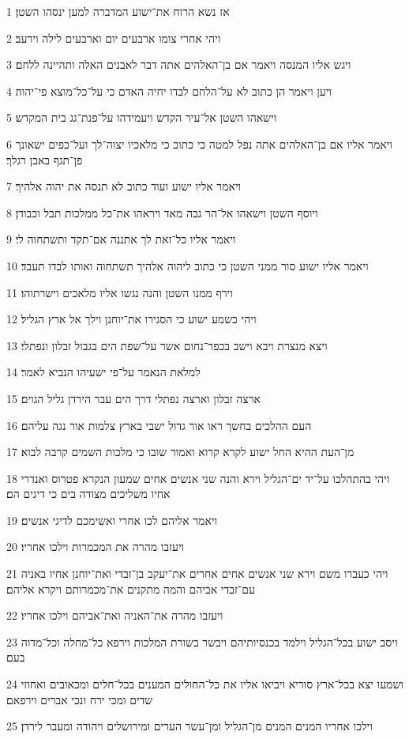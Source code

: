 \par 1 אז נשא הרוח את־ישוע המדברה למען ינסהו השטן׃
\par 2 ויהי אחרי צומו ארבעים יום וארבעים לילה וירעב׃
\par 3 ויגש אליו המנסה ויאמר אם בן־האלהים אתה דבר לאבנים האלה ותהיינה ללחם׃
\par 4 ויען ויאמר הן כתוב לא על־הלחם לבדו יחיה האדם כי על־כל־מוצא פי־יהוה׃
\par 5 וישאהו השטן אל־עיר הקדש ויעמידהו על־פנת־גג בית המקדש׃
\par 6 ויאמר אליו אם בן־האלהים אתה נפל למטה כי כתוב כי מלאכיו יצוה־לך ועל־כפים ישאונך פן־תגף באבן רגלך׃
\par 7 ויאמר אליו ישוע ועוד כתוב לא תנסה את יהוה אלהיך׃
\par 8 ויוסף השטן וישאהו אל־הר גבה מאד ויראהו את־כל ממלכות תבל וכבודן׃
\par 9 ויאמר אליו כל־זאת לך אתננה אם־תקד ותשתחוה לי׃
\par 10 ויאמר אליו ישוע סור ממני השטן כי כתוב ליהוה אלהיך תשתחוה ואותו לבדו תעבד׃
\par 11 וירף ממנו השטן והנה נגשו אליו מלאכים וישרתוהו׃
\par 12 ויהי כשמע ישוע כי הסגירו את־יוחנן וילך אל ארץ הגליל׃
\par 13 ויצא מנצרת ויבא וישב בכפר־נחום אשר על־שפת הים בגבול זבלון ונפתלי׃
\par 14 למלאת הנאמר על־פי ישעיהו הנביא לאמר׃
\par 15 ארצה זבלון וארצה נפתלי דרך הים עבר הירדן גליל הגוים׃
\par 16 העם ההלכים בחשך ראו אור גדול ישבי בארץ צלמות אור נגה עליהם׃
\par 17 מן־העת ההיא החל ישוע לקרא קרוא ואמור שובו כי מלכות השמים קרבה לבוא׃
\par 18 ויהי בהתהלכו על־יד ים־הגליל וירא והנה שני אנשים אחים שמעון הנקרא פטרוס ואנדרי אחיו משליכים מצודה בים כי דיגים הם׃
\par 19 ויאמר אליהם לכו אחרי ואשימכם לדיגי אנשים׃
\par 20 ויעזבו מהרה את המכמרות וילכו אחריו׃
\par 21 ויהי כעברו משם וירא שני אנשים אחים אחרים את־יעקב בן־זבדי ואת־יוחנן אחיו באניה עם־זבדי אביהם והמה מתקנים את־מכמרותם ויקרא אליהם׃
\par 22 ויעזבו מהרה את־האניה ואת־אביהם וילכו אחריו׃
\par 23 ויסב ישוע בכל־הגליל וילמד בכנסיותיהם ויבשר בשורת המלכות וירפא כל־מחלה וכל־מדוה בעם׃
\par 24 ושמעו יצא בכל־ארץ סוריא ויביאו אליו את כל־החולים המענים בכל־חלים ומכאובים ואחוזי שדים ומכי ירח ונכי אברים וירפאם׃
\par 25 וילכו אחריו המנים המנים מן־הגליל ומן־עשר הערים ומירושלים ויהודה ומעבר לירדן׃


